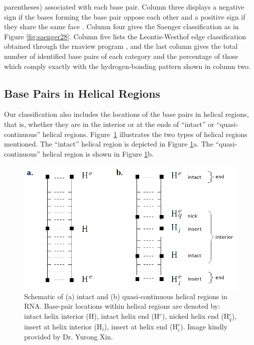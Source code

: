 \begin{table}
\begin{center}
{parentheses) associated with each base pair.
Column  three  displays a  negative  sign  if  the bases  forming  the
base pair oppose each other and a positive sign if they share the same
face \cite{lu2003}.   Column four gives the  Saenger classification as
in Figure \ref{fig:saenger28}.   Column five lists the Leontis-Westhof
edge    classification   obtained    through   the    rnaview   program
\cite{yang2003},  and  the  last  column  gives the  total  number  of
identified base  pairs of  each category and  the percentage  of those
which comply exactly with the hydrogen-bonding pattern shown in column
two.}
\label{tab:seven}
\end{center}  
\end{table}  


\subsection{Base Pairs in Helical Regions}
Our classification also includes the locations of the base pairs in helical
regions, that is,  whether they are in the interior or  at the ends of
``intact'' or ``quasi-continuous'' helical
regions.  Figure~\ref{fig:helregxin}  illustrates  the  two  types  of
helical regions  mentioned. The ``intact'' helical region
is depicted in Figure \ref{fig:helregxin}a.
The ``quasi-continuous'' helical region is shown in Figure \ref{fig:helregxin}b.

\begin{figure}
\centering
\includegraphics[scale=0.4]{Chapter3/helcontext.png}
\caption{Schematic of (a) intact and (b) quasi-continuous helical regions in
  RNA.   Base-pair locations  within helical  regions are  denoted by:
  intact helix interior (H), intact helix end (H$^e$), 
  nicked  helix  end  (H$_q^e$),  insert at  helix  interior  (H$_i$),
  insert at helix end (H$_i^e$). Image kindly provided by Dr. Yurong Xin.}
\label{fig:helregxin}
\end{figure}  

